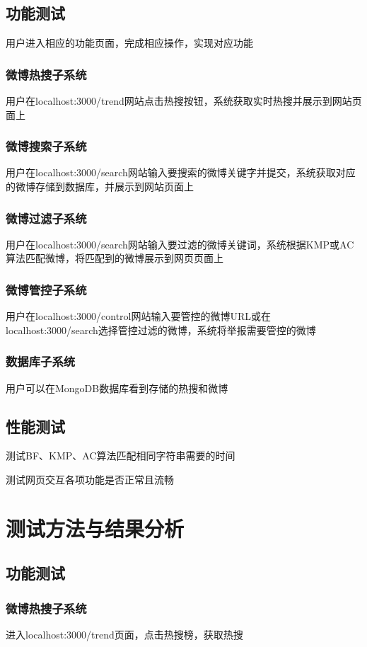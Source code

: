 \documentclass{ctexart}
\begin{document}
\subsection{功能测试}
用户进入相应的功能页面，完成相应操作，实现对应功能
\subsubsection{微博热搜子系统}
用户在localhost:3000/trend网站点击热搜按钮，系统获取实时热搜并展示到网站页面上

\subsubsection{微博搜索子系统}
用户在localhost:3000/search网站输入要搜索的微博关键字并提交，系统获取对应的微博存储到数据库，并展示到网站页面上
\subsubsection{微博过滤子系统}
用户在localhost:3000/search网站输入要过滤的微博关键词，系统根据KMP或AC算法匹配微博，将匹配到的微博展示到网页页面上
\subsubsection{微博管控子系统}
用户在localhost:3000/control网站输入要管控的微博URL或在localhost:3000/search选择管控过滤的微博，系统将举报需要管控的微博
\subsubsection{数据库子系统}
用户可以在MongoDB数据库看到存储的热搜和微博
\subsection{性能测试}
测试BF、KMP、AC算法匹配相同字符串需要的时间

测试网页交互各项功能是否正常且流畅
\section{测试方法与结果分析}
\subsection{功能测试}
\subsubsection{微博热搜子系统}
进入localhost:3000/trend页面，点击热搜榜，获取热搜
\end{document}
